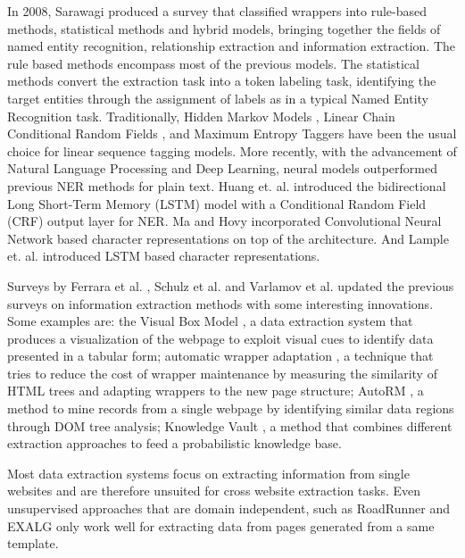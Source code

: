 \documentclass{nle}
\begin{document}
In 2008, Sarawagi  produced a survey that classified wrappers into
rule-based methods, statistical methods and hybrid models, bringing together 
the fields of named entity recognition, relationship extraction and information extraction. 
The rule based methods encompass most of the 
previous models. The statistical methods convert the extraction task into a token labeling 
task, identifying the target entities through the assignment of labels as in a typical 
Named Entity Recognition task. Traditionally, Hidden Markov Models \cite{Leek1997,Freitag1999}, 
Linear Chain Conditional Random Fields \cite{Lafferty2001}, and Maximum Entropy Taggers 
\cite{McCallum2000} have been the usual choice for linear sequence tagging models.
More recently, with the advancement of Natural Language Processing and Deep Learning, 
neural models outperformed previous NER methods for plain text. Huang et. al.  introduced the 
bidirectional Long Short-Term Memory (LSTM) model with a Conditional Random Field (CRF) output layer
for NER. Ma and Hovy  incorporated Convolutional Neural Network based character representations 
on top of the architecture. And Lample et. al.  introduced
LSTM based character representations. 

Surveys by Ferrara et al. , Schulz et al.  and 
Varlamov et al.  updated the previous surveys on information 
extraction methods with some interesting innovations. 
Some examples are: the Visual Box Model \cite{Krupl2005}, a data extraction system that produces 
a visualization of the webpage to exploit visual cues to identify data presented in a tabular form;
automatic wrapper adaptation \cite{Ferrara2011}, a technique that tries to reduce the cost of 
wrapper maintenance by measuring the similarity of HTML trees and adapting
wrappers to the new page structure; AutoRM \cite{Shi2015}, a method to mine
records from a single webpage by identifying similar data regions through DOM
tree analysis; Knowledge Vault \cite{Dong2014}, a method that combines different 
extraction approaches to feed a probabilistic knowledge base.

Most data extraction systems focus on extracting information from single websites
and are therefore unsuited for cross website extraction tasks. Even unsupervised
approaches that are domain independent, such as RoadRunner \cite{Crescenzi2001} 
and EXALG \cite{Arasu2003} only work well for extracting data from pages generated 
from a same template. 
\end{document}
